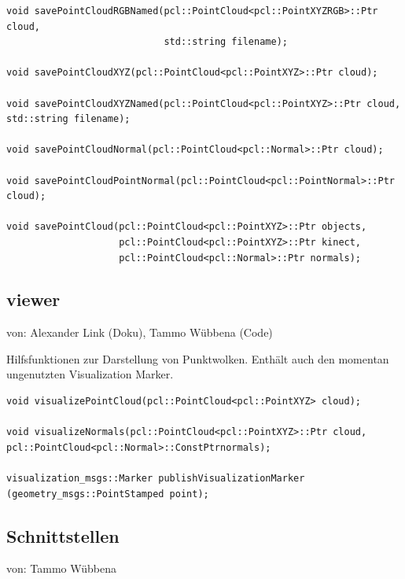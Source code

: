 \documentclass{suturo}
\makeatletter
\newcommand{\chapterauthor}[1]{%
  {\parindent0pt\vspace*{-27pt}%
  \linespread{0}\small\begin{flushright}von: #1\end{flushright}%
  \par\nobreak\vspace*{0pt}}
  \@afterheading%
}
\makeatother
\begin{document}
\begin{verbatim}
void savePointCloudRGBNamed(pcl::PointCloud<pcl::PointXYZRGB>::Ptr cloud,
                            std::string filename);
                            
void savePointCloudXYZ(pcl::PointCloud<pcl::PointXYZ>::Ptr cloud);

void savePointCloudXYZNamed(pcl::PointCloud<pcl::PointXYZ>::Ptr cloud,
std::string filename);

void savePointCloudNormal(pcl::PointCloud<pcl::Normal>::Ptr cloud);

void savePointCloudPointNormal(pcl::PointCloud<pcl::PointNormal>::Ptr cloud);

void savePointCloud(pcl::PointCloud<pcl::PointXYZ>::Ptr objects,
                    pcl::PointCloud<pcl::PointXYZ>::Ptr kinect,
                    pcl::PointCloud<pcl::Normal>::Ptr normals);
\end{verbatim}


\subsection*{viewer}
\chapterauthor{Alexander Link (Doku), Tammo Wübbena (Code)}
Hilfsfunktionen zur Darstellung von Punktwolken.
Enthält auch den momentan ungenutzten Visualization Marker.

\begin{verbatim}
void visualizePointCloud(pcl::PointCloud<pcl::PointXYZ> cloud);

void visualizeNormals(pcl::PointCloud<pcl::PointXYZ>::Ptr cloud,
pcl::PointCloud<pcl::Normal>::ConstPtrnormals);

visualization_msgs::Marker publishVisualizationMarker
(geometry_msgs::PointStamped point);
\end{verbatim}


\subsection{Schnittstellen}
\chapterauthor{Tammo Wübbena}
\end{document}
